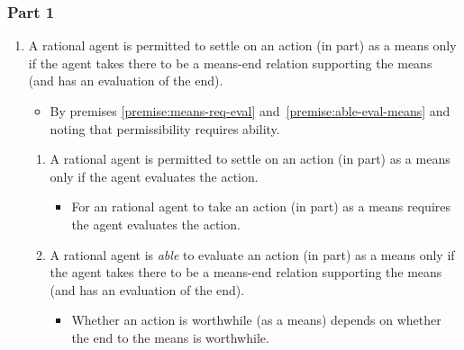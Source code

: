 \documentclass[noamssymb,
]{beamer} %
\begin{document}
\begin{frame}
  \frametitle{Part 1}

  \begin{enumerate}
\item\label{premise:permit-eval-means} A rational agent is permitted to settle on an action (in part) as a means only if the agent takes there to be a means-end relation supporting the means (and has an evaluation of the end).
    \begin{itemize}
    \item By premises \ref{premise:means-req-eval} and~\ref{premise:able-eval-means} and noting that permissibility requires ability.
    \end{itemize}
  \begin{enumerate}
  \item\label{premise:means-req-eval} A rational agent is permitted to settle on an action (in part) as a means only if the agent evaluates the action.
    \begin{itemize}
    \item For an rational agent to take an action (in part) as a means requires the agent evaluates the action.
    \end{itemize}
  \item\label{premise:able-eval-means} A rational agent is \emph{able} to evaluate an action (in part) as a means only if the agent takes there to be a means-end relation supporting the means (and has an evaluation of the end).
    \begin{itemize}
    \item Whether an action is worthwhile (as a means) depends on whether the end to the means is worthwhile.
    \end{itemize}
  \end{enumerate}
\end{enumerate}

\end{frame}
\end{document}
